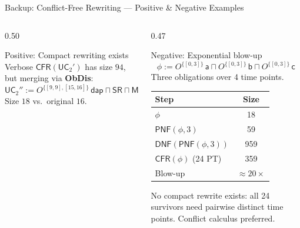\documentclass[9pt,aspectratio=169]{beamer}
\newcommand{\pnf}{\ensuremath{\mathsf{PNF}}}
\newcommand{\dnf}{\ensuremath{\mathsf{DNF}}}
\newcommand{\Namb}{\ensuremath{\mathsf{CFR}}\xspace}
\newcommand{\delAtPark}{\ensuremath{\mathsf{dap}}\xspace}
\newcommand{\SR}{\ensuremath{\mathsf{SR}}\xspace}
\newcommand{\MA}{\ensuremath{\mathsf{MA}}\xspace}
\newcommand{\UC}{\ensuremath{\mathsf{UC}}\xspace}
\newcommand{\ob}[2]{\ensuremath{O^{#1}\,#2}}
\begin{document}
\begin{frame}{Backup: Conflict-Free Rewriting — Positive \& Negative Examples}
\begin{columns}[T]
\begin{column}{0.50\textwidth}
\begin{block}{\textcolor{ConflictGreen}{Positive: Compact rewriting exists}}
    Verbose $\Namb(\UC_2')$ has size $94$, but merging via \textbf{ObDis}:
    \[
    \UC_2'' := \ob{\{[9,9],[15,16]\}}{\delAtPark} \sqcap \SR \sqcap \MA
    \]
    Size $18$ vs.\ original $16$. {\color{ConflictGreen}\checkmark}
  \end{block}
\end{column}
\begin{column}{0.47\textwidth}
  \begin{block}{\textcolor{ConflictRed}{Negative: Exponential blow-up}}
    \[
    \phi := \ob{\{[0,3]\}}{\mathsf{a}} \sqcap \ob{\{[0,3]\}}{\mathsf{b}} \sqcap \ob{\{[0,3]\}}{\mathsf{c}}
    \]
    Three obligations over 4 time points.
    \vspace{1mm}
    \begin{center}
    \renewcommand{\arraystretch}{1.2}
    \begin{tabular}{lc}
    \hline
    \textbf{Step} & \textbf{Size} \\\hline
    $\phi$ & 18 \\
    $\pnf(\phi,3)$ & 59 \\
    $\dnf(\pnf(\phi,3))$ & 959 \\
    $\Namb(\phi)$ (24 PT) & 359 \\\hline
    Blow-up & $\approx 20\times$
    \end{tabular}
    \end{center}
    \vspace{1mm}
    No compact rewrite exists: all 24 survivors need pairwise distinct time points. {\color{ConflictRed}Conflict calculus preferred.}
  \end{block}
\end{column}
\end{columns}
\end{frame}
\end{document}
